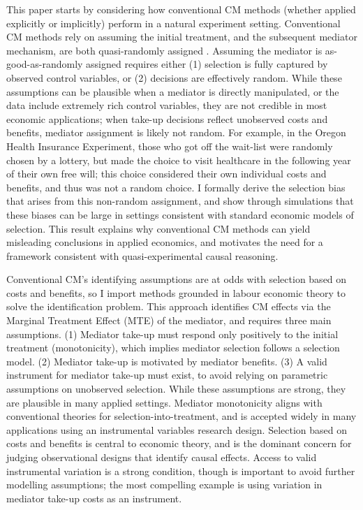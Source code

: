 This paper starts by considering how conventional CM methods (whether applied explicitly or implicitly) perform in a natural experiment setting.
Conventional CM methods rely on assuming the initial treatment, and the subsequent mediator mechanism, are both quasi-randomly assigned \citep{imai2010identification}.
Assuming the mediator is as-good-as-randomly assigned requires either (1) selection is fully captured by observed control variables, or (2) decisions are effectively random.
While these assumptions can be plausible when a mediator is directly manipulated, or the data include extremely rich control variables, they are not credible in most economic applications; when take-up decisions reflect unobserved costs and benefits, mediator assignment is likely not random.
For example, in the Oregon Health Insurance Experiment, those who got off the wait-list were randomly chosen by a lottery, but made the choice to visit healthcare in the following year of their own free will; this choice considered their own individual costs and benefits, and thus was not a random choice.
I formally derive the selection bias that arises from this non-random assignment, and show through simulations that these biases can be large in settings consistent with standard economic models of selection.
This result explains why conventional CM methods can yield misleading conclusions in applied economics, and motivates the need for a framework consistent with quasi-experimental causal reasoning.

Conventional CM's identifying assumptions are at odds with selection based on costs and benefits, so I import methods grounded in labour economic theory to solve the identification problem.
This approach identifies CM effects via the Marginal Treatment Effect (MTE) of the mediator, and requires three main assumptions.
(1) Mediator take-up must respond only positively to the initial treatment (monotonicity), which implies mediator selection follows a selection model.
(2) Mediator take-up is motivated by mediator benefits.
(3) A valid instrument for mediator take-up must exist, to avoid relying on parametric assumptions on unobserved selection.
While these assumptions are strong, they are plausible in many applied settings.
Mediator monotonicity aligns with conventional theories for selection-into-treatment, and is accepted widely in many applications using an instrumental variables research design.
Selection based on costs and benefits is central to economic theory, and is the dominant concern for judging observational designs that identify causal effects.
Access to valid instrumental variation is a strong condition, though is important to avoid further modelling assumptions; the most compelling example is using variation in mediator take-up costs as an instrument.

